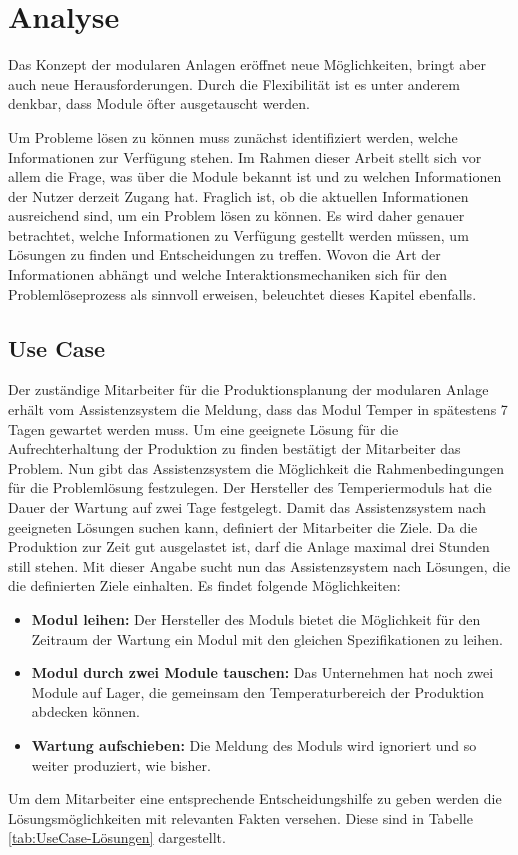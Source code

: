 
\chapter{Analyse}
\label{sec:Anforderungsanalyse}
Das Konzept der modularen Anlagen eröffnet neue Möglichkeiten, bringt aber auch neue Herausforderungen. Durch die Flexibilität ist es unter anderem denkbar, dass Module öfter ausgetauscht werden.

Um Probleme lösen zu können muss zunächst identifiziert werden, welche Informationen zur Verfügung stehen. Im Rahmen dieser Arbeit stellt sich vor allem die Frage, was über die Module bekannt ist und zu welchen Informationen der Nutzer derzeit Zugang hat.  Fraglich ist, ob die aktuellen Informationen ausreichend sind, um ein Problem lösen zu können. Es wird daher genauer betrachtet, welche Informationen zu Verfügung gestellt werden müssen, um Lösungen zu finden und Entscheidungen zu treffen. Wovon die Art der Informationen abhängt und welche Interaktionsmechaniken sich für den Problemlöseprozess als sinnvoll erweisen, beleuchtet dieses Kapitel ebenfalls.

\section{Use Case}
Der zuständige Mitarbeiter für die Produktionsplanung der modularen Anlage erhält vom Assistenzsystem die Meldung, dass das Modul Temper in spätestens 7 Tagen gewartet werden muss. Um eine geeignete Lösung für die Aufrechterhaltung der Produktion zu finden bestätigt der Mitarbeiter das Problem. Nun gibt das Assistenzsystem die Möglichkeit die Rahmenbedingungen für die Problemlösung festzulegen. Der Hersteller des Temperiermoduls hat die Dauer der Wartung auf zwei Tage festgelegt. Damit das Assistenzsystem nach geeigneten Lösungen suchen kann, definiert der Mitarbeiter die Ziele. Da die Produktion zur Zeit gut ausgelastet ist, darf die Anlage maximal drei Stunden still stehen. Mit dieser Angabe sucht nun das Assistenzsystem nach Lösungen, die die definierten Ziele einhalten. Es findet folgende Möglichkeiten:
\begin{itemize}
\item \textbf{Modul leihen:} Der Hersteller des Moduls bietet die Möglichkeit für den Zeitraum der Wartung ein Modul mit den gleichen Spezifikationen zu leihen.
\item \textbf{Modul durch zwei Module tauschen:} Das Unternehmen hat noch zwei Module auf Lager, die gemeinsam den Temperaturbereich der Produktion abdecken können.
\item \textbf{Wartung aufschieben:} Die Meldung des Moduls wird ignoriert und so weiter produziert, wie bisher.
\end{itemize}
Um dem Mitarbeiter eine entsprechende Entscheidungshilfe zu geben werden die Lösungsmöglichkeiten mit relevanten Fakten versehen. Diese sind in Tabelle \ref{tab:UseCase-Lösungen} dargestellt.

